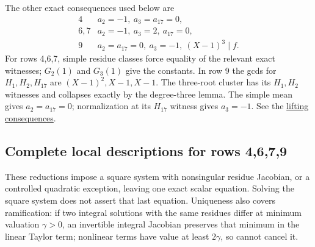 \documentclass[
  british,
  10pt,
]{article}
\begin{document}
The other exact consequences used below are \[
\begin{array}{c|l}
4&a_2=-1,\ a_3=a_{17}=0,\\
6,7&a_2=-1,\ a_3=2,\ a_{17}=0,\\
9&a_2=a_{17}=0,\ a_3=-1,\ (X-1)^3\mid f.
\end{array}                                                    \tag{D5}
\] For rows 4,6,7, simple residue classes force equality of the relevant
exact witnesses; \(G_2(1)\) and \(G_3(1)\) give the constants. In row 9
the gcds for \(H_1,H_2,H_{17}\) are \((X-1)^2,X-1,X-1\). The three-root
cluster has its \(H_1,H_2\) witnesses and collapses exactly by the
degree-three lemma. The simple mean gives \(a_2=a_{17}=0\);
normalization at its \(H_{17}\) witness gives \(a_3=-1\). See the
\href{evidence/full/LIFT_CONSEQUENCES_17.md}{lifting consequences}.

\subsection{Complete local descriptions for rows
4,6,7,9}\label{complete-local-descriptions-for-rows-4679}

These reductions impose a square system with nonsingular residue
Jacobian, or a controlled quadratic exception, leaving one exact scalar
equation. Solving the square system does not assert that last equation.
Uniqueness also covers ramification: if two integral solutions with the
same residues differ at minimum valuation \(\gamma>0\), an invertible
integral Jacobian preserves that minimum in the linear Taylor term;
nonlinear terms have value at least \(2\gamma\), so cannot cancel it.
\end{document}
